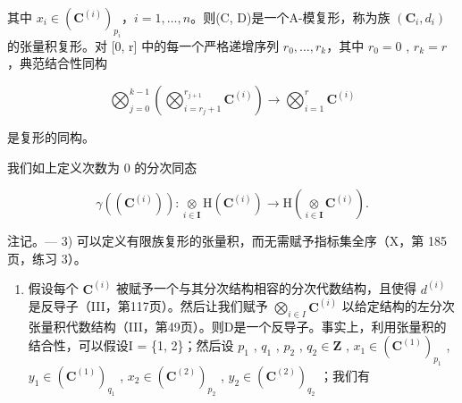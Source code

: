 其中 \(x_{i}\in (\mathbf{C}^{(i)})_{p_{i}}\)，\(i = 1,\dots,n\)。则(C, D)是一个A-模复形，称为族 \((\mathbf{C}_{i}, d_{i})\) 的张量积复形。对 [0, r] 中的每一个严格递增序列 \(r_{0}, \ldots, r_{k}\)，其中 \(r_{0} = 0\) , \(r_{k} = r\) ，典范结合性同构

\[
\bigotimes_ {j = 0} ^ {k - 1} \left(\bigotimes_ {i = r _ {j} + 1} ^ {r _ {j + 1}} \mathbf {C} ^ {(i)}\right)\rightarrow \bigotimes_ {i = 1} ^ {r} \mathbf {C} ^ {(i)}
\]

是复形的同构。

我们如上定义次数为 0 的分次同态

\[
\gamma ((\mathbf {C} ^ {(i)})): \underset {i \in \mathbf {I}} {\otimes} \mathrm{H} (\mathbf {C} ^ {(i)}) \to \mathrm{H} \left(\underset {i \in \mathbf {I}} {\otimes} \mathbf {C} ^ {(i)}\right) .
\]

注记。--- 3) 可以定义有限族复形的张量积，而无需赋予指标集全序（X，第 185 页，练习 3）。

\begin{enumerate}
\def\labelenumi{\arabic{enumi})}
\setcounter{enumi}{3}
\tightlist
\item
  假设每个 \(\mathbf{C}^{(i)}\) 被赋予一个与其分次结构相容的分次代数结构，且使得 \(d^{(i)}\) 是反导子（III，第117页）。然后让我们赋予 \(\bigotimes_{i\in I}\mathbf{C}^{(i)}\) 以给定结构的左分次张量积代数结构（III，第49页）。则D是一个反导子。事实上，利用张量积的结合性，可以假设I = \{1, 2\}；然后设 \(p_1\) , \(q_1\) , \(p_2\) , \(q_2 \in \mathbf{Z}\) , \(x_1 \in (\mathbf{C}^{(1)})_{p_1}\) , \(y_1 \in (\mathbf{C}^{(1)})_{q_1}\) , \(x_2 \in (\mathbf{C}^{(2)})_{p_2}\) , \(y_2 \in (\mathbf{C}^{(2)})_{q_2}\) ；我们有
\end{enumerate}

